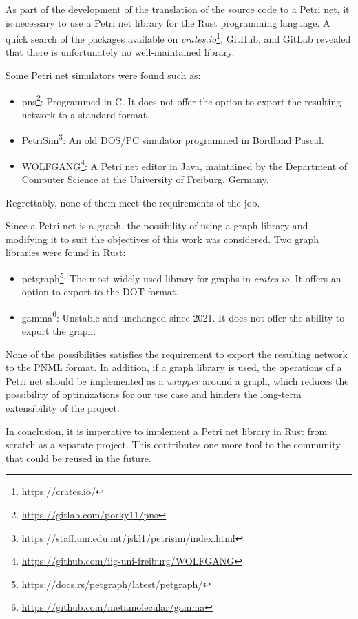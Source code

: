 \documentclass[../Thesis.tex]{subfiles}
\begin{document}
As part of the development of the translation of the source code to a Petri net,
it is necessary to use a Petri net library for the Rust programming language.
A quick search of the packages available on
\emph{crates.io}\footnote{\url{https://crates.io/}}, GitHub, and GitLab
revealed that there is unfortunately no well-maintained library.

Some Petri net simulators were found such as:

\begin{itemize}
      \item pns\footnote{\url{https://gitlab.com/porky11/pns}}:
            Programmed in C. It does not offer the option
            to export the resulting network to a standard format.
      \item PetriSim\footnote{\url{https://staff.um.edu.mt/jskl1/petrisim/index.html}}:
            An old DOS/PC simulator programmed in Bordland Pascal.
      \item WOLFGANG\footnote{\url{https://github.com/iig-uni-freiburg/WOLFGANG}}:
            A Petri net editor in Java, maintained by the Department of Computer Science
            at the University of Freiburg, Germany.
\end{itemize}

Regrettably, none of them meet the requirements of the job.

Since a Petri net is a graph, the possibility
of using a graph library and modifying it to suit the objectives of this work was considered.
Two graph libraries were found in Rust:

\begin{itemize}
      \item petgraph\footnote{\url{https://docs.rs/petgraph/latest/petgraph/}}:
            The most widely used library for graphs in \textit{crates.io}.
            It offers an option to export to the DOT format.
      \item gamma\footnote{\url{https://github.com/metamolecular/gamma}}:
            Unstable and unchanged since 2021. It does not offer the ability to export the graph.
\end{itemize}

None of the possibilities satisfies the requirement
to export the resulting network to the \acrshort{PNML} format.
In addition, if a graph library is used,
the operations of a Petri net should be implemented as a \emph{wrapper} around a graph,
which reduces the possibility of optimizations for our use case
and hinders the long-term extensibility of the project.

In conclusion, it is imperative
to implement a Petri net library in Rust from scratch as a separate project.
This contributes one more tool to the community that could be reused in the future.
\end{document}
